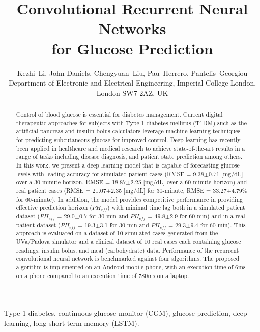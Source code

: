 \documentclass[a4paper, 10 pt, twocolumn]{IEEEtran}
\begin{document}
\title{Convolutional Recurrent Neural Networks \\ for Glucose Prediction}
\author{Kezhi~Li, John Daniels, Chengyuan~Liu,  Pau~Herrero, Pantelis~Georgiou\\
Department of Electronic and Electrical Engineering, Imperial College London, London SW7 2AZ, UK\\

}

\maketitle

\begin{abstract}
Control of blood glucose is essential for diabetes management. Current digital therapeutic approaches for subjects with Type 1 diabetes mellitus (T1DM) such as the artificial pancreas and insulin bolus calculators
leverage machine learning techniques for predicting subcutaneous glucose for improved control. Deep learning has recently been applied in healthcare and medical research to achieve state-of-the-art results in a range of
tasks including disease diagnosis, and patient state prediction among others. In this work, we present a deep learning model that is capable of forecasting glucose levels with leading accuracy for simulated patient
cases (RMSE = 9.38$\pm$0.71 [mg/dL] over a 30-minute horizon, RMSE = 18.87$\pm$2.25 [mg/dL] over a 60-minute horizon) and real patient cases (RMSE = 21.07$\pm$2.35 [mg/dL] for 30-minute, RMSE = 33.27$\pm$4.79\% for
60-minute). In addition, the model provides competitive performance in providing effective prediction horizon ($PH_{eff}$) with minimal time lag both in a simulated patient dataset ($PH_{eff}$ = 29.0$\pm$0.7 for 30-min
and $PH_{eff}$ = 49.8$\pm$2.9 for 60-min) and in a real patient dataset ($PH_{eff}$ = 19.3$\pm$3.1 for 30-min and $PH_{eff}$ = 29.3$\pm$9.4 for 60-min). This approach is evaluated on a dataset of 10 simulated cases
generated from the UVa/Padova simulator and a clinical dataset of 10 real cases each containing glucose readings, insulin bolus, and meal (carbohydrate) data. Performance of the recurrent convolutional neural network is
benchmarked against four algorithms. The proposed algorithm is implemented on an Android mobile phone, with an execution time of $6$ms on a phone compared to an execution time of $780$ms on a laptop.
\end{abstract}


\begin{IEEEkeywords}
Type 1 diabetes, continuous glucose monitor (CGM), glucose prediction, deep learning, long short term memory (LSTM).
\end{IEEEkeywords}
\end{document}
